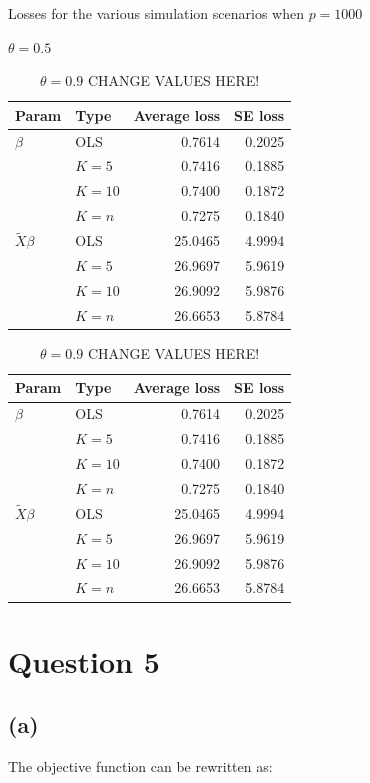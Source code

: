 \documentclass{article}\usepackage[]{graphicx}\usepackage[]{color}
\begin{document}
\begin{table}[!htb]
    \caption{Losses for the various simulation scenarios when $p=1000$}
    \begin{minipage}{.5\linewidth}
      \caption{$\theta=0.5$}
      \centering
      \begin{tabular}{|llrr|}
       \hline
     Param & Type & Average loss & SE loss \\ 
      \hline
   $\beta$ & OLS & 0.7614 & 0.2025 \\ 
   & $K=5$  & 0.7416 & 0.1885 \\ 
   & $K=10$ & 0.7400 & 0.1872 \\ 
   & $K=n$ & 0.7275 & 0.1840 \\ 
   \hline
    $\tilde{X}\beta$ & OLS & 25.0465 & 4.9994 \\ 
    & $K=5$ & 26.9697 & 5.9619 \\ 
    & $K=10$ & 26.9092 & 5.9876 \\ 
    & $K=n$ & 26.6653 & 5.8784 \\ 
    \hline
  \end{tabular}
  \end{minipage}%
  \begin{minipage}{.5\linewidth}
      \centering
        \caption{$\theta=0.9$ CHANGE VALUES HERE!}
        \begin{tabular}{|llrr|}
       \hline
     Param & Type & Average loss & SE loss \\ 
      \hline
   $\beta$ & OLS & 0.7614 & 0.2025 \\ 
   & $K=5$  & 0.7416 & 0.1885 \\ 
   & $K=10$ & 0.7400 & 0.1872 \\ 
   & $K=n$ & 0.7275 & 0.1840 \\ 
   \hline
    $\tilde{X}\beta$ & OLS & 25.0465 & 4.9994 \\ 
    & $K=5$ & 26.9697 & 5.9619 \\ 
    & $K=10$ & 26.9092 & 5.9876 \\ 
    & $K=n$ & 26.6653 & 5.8784 \\ 
    \hline
  \end{tabular}
    \end{minipage} 
\end{table}


\section*{Question 5}
\subsection*{(a)}
The objective function can be rewritten as:
\end{document}
